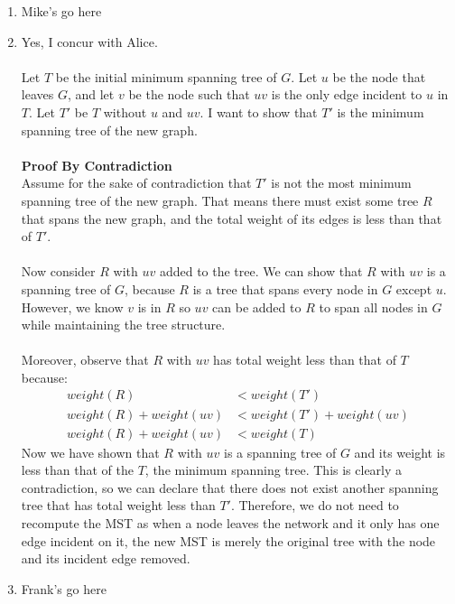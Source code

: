\documentclass[12pt]{article}
\begin{document}
\begin{enumerate}
	\item Mike's go here
	\item Yes, I concur with Alice. \\ \\Let $T$ be the initial minimum spanning tree of $G$. Let $u$ be the node that leaves $G$, and let $v$ be the node such that $uv$ is the only edge incident to $u$ in $T$. Let $T'$ be $T$ without $u$ and $uv$. I want to show that $T'$ is the minimum spanning tree of the new graph. \\ \\ \textbf{Proof By Contradiction} \\ Assume for the sake of contradiction that $T'$ is not the most minimum spanning tree of the new graph. That means there must exist some tree $R$ that spans the new graph, and the total weight of its edges is less than that of $T'$. \\ \\ Now consider $R$ with $uv$ added to the tree. We can show that $R$ with $uv$ is a spanning tree of $G$, because $R$ is a tree that spans every node in $G$ except $u$. However, we know $v$ is in $R$ so $uv$ can be added to $R$ to span all nodes in $G$ while maintaining the tree structure. \\ \\ Moreover, observe that $R$ with $uv$ has total weight less than that of $T$ because:
	\begin{align*}
	weight(R) &< weight(T')\\
	weight(R) + weight(uv) &< weight(T') + weight(uv)\\
	weight(R) + weight(uv) &< weight(T)
	\end{align*}
	Now we have shown that $R$ with $uv$ is a spanning tree of $G$ and its weight is less than that of the $T$, the minimum spanning tree. This is clearly a contradiction, so we can declare that there does not exist another spanning tree that has total weight less than $T'$. Therefore, we do not need to recompute the MST as when a node leaves the network and it only has one edge incident on it, the new MST is merely the original tree with the node and its incident edge removed.
	\item Frank's go here
\end{enumerate}
\end{document}
